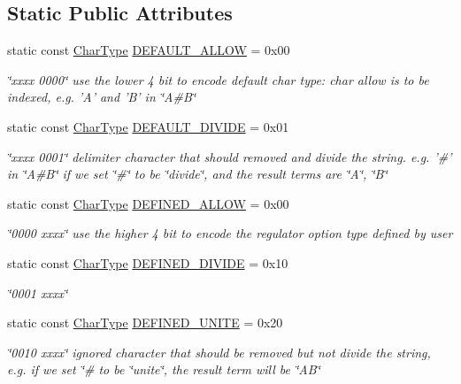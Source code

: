 \subsection*{Static Public Attributes}
\begin{CompactItemize}
\item 
static const \hyperlink{namespacela__manager_aa4b42b4146948a208eabd25288ad99b}{CharType} \hyperlink{classla__manager_1_1CharTypeTable_f3e49258e07d5f67515de16598ef70b3}{DEFAULT\_\-ALLOW} = 0x00
\begin{CompactList}\small\item\em \char`\"{}xxxx 0000\char`\"{} use the lower 4 bit to encode default char type: char allow is to be indexed, e.g. 'A' and 'B' in \char`\"{}A\#B\char`\"{} \item\end{CompactList}\item 
static const \hyperlink{namespacela__manager_aa4b42b4146948a208eabd25288ad99b}{CharType} \hyperlink{classla__manager_1_1CharTypeTable_3e1273a73ef3b0f495c08b53e0fb17ce}{DEFAULT\_\-DIVIDE} = 0x01
\begin{CompactList}\small\item\em \char`\"{}xxxx 0001\char`\"{} delimiter character that should removed and divide the string. e.g. '\#' in \char`\"{}A\#B\char`\"{} if we set \char`\"{}\#\char`\"{} to be \char`\"{}divide\char`\"{}, and the result terms are \char`\"{}A\char`\"{}, \char`\"{}B\char`\"{} \item\end{CompactList}\item 
static const \hyperlink{namespacela__manager_aa4b42b4146948a208eabd25288ad99b}{CharType} \hyperlink{classla__manager_1_1CharTypeTable_24cd292ce579aec3623576c01f825711}{DEFINED\_\-ALLOW} = 0x00
\begin{CompactList}\small\item\em \char`\"{}0000 xxxx\char`\"{} use the higher 4 bit to encode the regulator option type defined by user \item\end{CompactList}\item 
static const \hyperlink{namespacela__manager_aa4b42b4146948a208eabd25288ad99b}{CharType} \hyperlink{classla__manager_1_1CharTypeTable_0f2478ccc6c68f09e814030b82bf0b3e}{DEFINED\_\-DIVIDE} = 0x10
\begin{CompactList}\small\item\em \char`\"{}0001 xxxx\char`\"{} \item\end{CompactList}\item 
static const \hyperlink{namespacela__manager_aa4b42b4146948a208eabd25288ad99b}{CharType} \hyperlink{classla__manager_1_1CharTypeTable_7c1779063e32cc836decb19a51ada7bb}{DEFINED\_\-UNITE} = 0x20
\begin{CompactList}\small\item\em \char`\"{}0010 xxxx\char`\"{} ignored character that should be removed but not divide the string, e.g. if we set \char`\"{}\# to be \char`\"{}unite\char`\"{}, the result term will be \char`\"{}AB\char`\"{} \item\end{CompactList}\end{CompactItemize}
